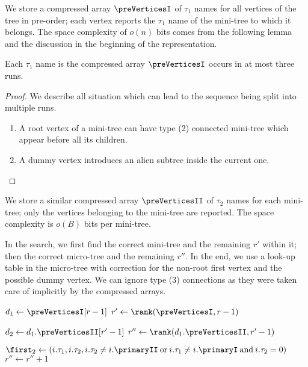 We store a compressed array $\preVerticesI$ of $\tau_1$ names for all vertices of the tree in pre-order; each vertex reports the $\tau_1$ name of the mini-tree to which it belongs.
The space complexity of $o(n)$ bits comes from the following lemma and the discussion in the beginning of the representation.

\begin{lemma}
	Each $\tau_1$ name is the compressed array $\preVerticesI$ occurs in at most three runs.
\end{lemma}
\begin{proof}
	We describe all situation which can lead to the sequence being split into multiple runs.
	\begin{enumerate}
		\item A root vertex of a mini-tree can have type (2) connected mini-tree which appear before all its children.
		\item A dummy vertex introduces an alien subtree inside the current one.
	\end{enumerate}
\end{proof}

We store a similar compressed array $\preVerticesII$ of $\tau_2$ names for each mini-tree; only the vertices belonging to the mini-tree are reported.
The space complexity is $o(B)$ bits per mini-tree.

In the search, we first find the correct mini-tree and the remaining $r'$ within it; then the correct micro-tree and the remaining $r''$.
In the end, we use a look-up table in the micro-tree with correction for the non-root first vertex and the possible dummy vertex.
We can ignore type (3) connections as they were taken care of implicitly by the compressed arrays.

\begin{algorithm}
\begin{algorithmic}
	\State $d_1 \gets \preVerticesI[r - 1]$ 
	\State $r' \gets \rank(\preVerticesI, r - 1)$

	\State $d_2 \gets d_1.\preVerticesII[r' - 1]$ 
	\State $r'' \gets \rank(d_1.\preVerticesII, r' - 1)$
	
	\Statex
	
	\State $\first_2 \gets (i.\tau_1, i.\tau_2, i.\tau_2 \ne i.\primaryII \boolor i.\tau_1 \ne i.\primaryI \booland i.\tau_2 = 0)$
		\State $r'' \gets r'' + 1$ 
	\EndIf
	
	\State {}
\EndFunction
\end{algorithmic}
\end{algorithm}

